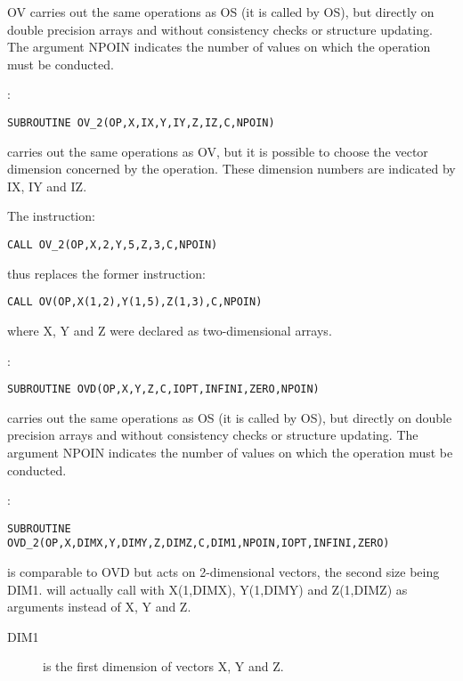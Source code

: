 OV carries out the same operations as OS (it is called by OS), but directly on
double precision arrays and without consistency checks or structure updating.
The argument NPOIN indicates the number of values on which the operation must
be conducted.

:
\begin{lstlisting}[language=TelFortran]
SUBROUTINE OV_2(OP,X,IX,Y,IY,Z,IZ,C,NPOIN)
\end{lstlisting}

 carries out the same operations as OV, but it is possible to choose the
vector dimension concerned by the operation. These dimension numbers are
indicated by IX, IY and IZ.

The instruction:

\begin{lstlisting}[language=TelFortran]
CALL OV_2(OP,X,2,Y,5,Z,3,C,NPOIN)
\end{lstlisting}
thus replaces the former instruction:

\begin{lstlisting}[language=TelFortran]
CALL OV(OP,X(1,2),Y(1,5),Z(1,3),C,NPOIN)
\end{lstlisting}

where X, Y and Z were declared as two-dimensional arrays.

:
\begin{lstlisting}[language=TelFortran]
SUBROUTINE OVD(OP,X,Y,Z,C,IOPT,INFINI,ZERO,NPOIN)
\end{lstlisting}

 carries out the same operations as OS (it is called by OS), but directly on
double precision arrays and without consistency checks or structure updating.
The argument NPOIN indicates the number of values on which the operation must
be conducted.

:
\begin{lstlisting}[language=TelFortran]
SUBROUTINE OVD_2(OP,X,DIMX,Y,DIMY,Z,DIMZ,C,DIM1,NPOIN,IOPT,INFINI,ZERO)
\end{lstlisting}

 is comparable to OVD but acts on 2-dimensional vectors, the
second size being DIM1.  will actually call  with
X(1,DIMX), Y(1,DIMY) and Z(1,DIMZ) as arguments instead of X, Y and Z.

\begin{description}
  \item [DIM1] is the first dimension of vectors X, Y and Z.
\end{description}

